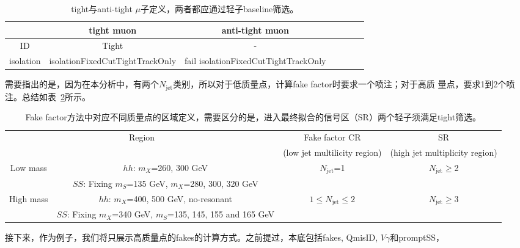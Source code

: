 \begin{table}[!ht]
\begin{center}
\begin{tabular}{c|cccccc}
\hline
  &tight muon    &anti-tight muon  \\
\hline
ID  &Tight  &- \\
isolation &isolationFixedCutTightTrackOnly  &fail isolationFixedCutTightTrackOnly \\
\hline
\end{tabular}
\caption{tight与anti-tight $\mu$子定义，两者都应通过轻子baseline筛选。}
\label{tab:tight_mu_def}
\end{center}
\end{table}
需要指出的是，因为在本分析中，有两个$N_{\text{jet}}$类别，所以对于低质量点，计算fake factor时要求一个喷注；对于高质
量点，要求1到2个喷注。总结如表~\ref{tab:summary_CRs_ff}所示。
\begin{table}[!ht]
\begin{center}
\scriptsize
\begin{tabular}{cc|c|c}
\hline
\multicolumn{2}{c|}{Region}  &Fake factor CR &SR   \\
                      			&    &(low jet multilicity region)  &(high jet multiplicity region) \\
\hline
\multirow{2}{*}{Low mass} &$hh$: $m_X$=260, 300 GeV  &$N_{\text{jet}}$=1    &$N_{\text{jet}} \geq$2 \\
                          &$SS$: Fixing $m_S$=135 GeV, $m_X$=280, 300, 320 GeV  &  & \\
\hline
\multirow{2}{*}{High mass} &$hh$: $m_X$=400, 500 GeV, no-resonant  &$1\leq N_{\text{jet}} \leq 2$    &$N_{\text{jet}} \geq$3 \\
                          &$SS$: Fixing $m_X$=340 GeV, $m_S$=135, 145, 155 and 165 GeV  &  & \\

\hline
\end{tabular}
\caption{Fake factor方法中对应不同质量点的区域定义，需要区分的是，进入最终拟合的信号区（SR）两个轻子须满足tight筛选。}
\label{tab:summary_CRs_ff}
\end{center}
\end{table}
接下来，作为例子，我们将只展示高质量点的fakes的计算方式。之前提过，本底包括fakes, QmisID, $V\gamma$和promptSS，

